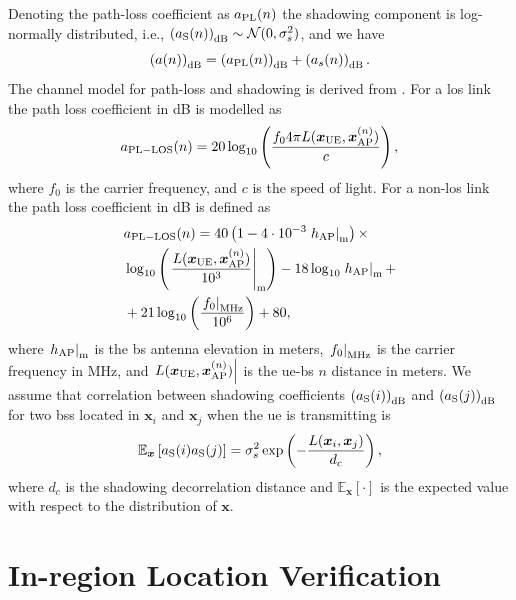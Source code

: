 \documentclass[conference,final]{IEEEtran}
\newcommand{\E}[2]{\mathbb{E}_{#1}\left[#2\right]}
\begin{document}
 Denoting the path-loss coefficient as $a_{\rm PL}{(n)}$  the shadowing component is log-normally distributed, i.e., $\left(a_{\rm S}{(n)}\right)_{\rm dB} \sim \mathcal{N}(0,\sigma_s^2)$, and we have
\begin{equation}
    \left(a{(n)}\right)_{\rm dB} = \left(a_{\rm PL}{(n)}\right)_{\rm dB} + \left(a_s{(n)}\right)_{\rm dB}.
\end{equation}
The channel model for path-loss and shadowing is derived from \cite{3gpp}. 
For a \ac{los} link the path loss coefficient in dB is modelled as
\begin{equation}\label{eq:los}
    a_{\rm PL-LOS}{(n)} = 20\log_{10}\left(\frac{f_0 4\pi L(\bm{x}_{\rm UE},\bm{x}_{\rm AP}^{(n)})}{c}\right),
\end{equation}
where $f_0$ is the carrier frequency, and $c$ is the speed of light. For a  non-\ac{los} link the path loss coefficient in dB is defined as
\begin{equation}
\begin{split}
    &a_{\rm PL-LOS}{(n)} = 40\left(1-4 \cdot 10^{-3} \left. h_{\rm AP} \right|_{\rm m} \right)  \times  \\
    &\log_{10}\left (\left.\frac{L(\bm{x}_{\rm UE},\bm{x}_{\rm AP}^{(n)})}{10^3}\right|_{\rm m}\right ) -18\log_{10}\left.h_{\rm AP}\right|_{\rm m} +\\
    &
    + 21\log_{10}\left(\frac{\left.f_0\right|_{\rm MHz}}{10^6}\right) + 80,
    \end{split}
\end{equation}
where $\left.h_{\rm AP}\right|_{\rm m}$ is the \ac{bs} antenna elevation in meters, $\left. f_0 \right|_{\rm MHz}$ is the carrier frequency in MHz, and $\left. L(\bm{x}_{\rm UE},\bm{x}_{\rm AP}^{(n)})\right|$ is the \ac{ue}-\ac{bs} $n$ distance in meters.
We assume that correlation between shadowing coefficients $\left( a_{\rm S}(i)\right)_{\rm dB}$ and $\left( a_{\rm S}(j)\right)_{\rm dB}$ for two \acp{bs} located in $\bm{x}_i$ and $\bm{x}_j$ when the \ac{ue} is transmitting is
\begin{equation}\label{eq: coor mat}
    \E{\bm x}{a_{\rm S}(i)a_{\rm S}(j)} = \sigma_s^2\exp \left({-\frac{L(\bm{x}_i,\bm{x}_j)}{d_c}}\right),
\end{equation}
where $d_c$ is the shadowing decorrelation distance and $\E{\bm x}{\cdot}$ is the expected value with respect to the distribution of $\bm x$.


\section{In-region Location Verification}\label{sec: ml}
\end{document}
